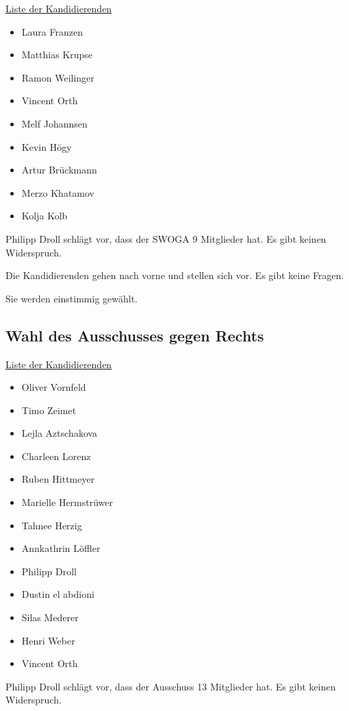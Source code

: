 \documentclass[ngerman,headheight=70pt]{scrartcl}
\begin{document}
    \underline{Liste der Kandidierenden}
    \begin{itemize}
        \item Laura Franzen
        \item Matthias Krupse
        \item Ramon Weilinger
        \item Vincent Orth
        \item Melf Johannsen
        \item Kevin Högy
        \item Artur Brückmann
        \item Merzo Khatamov
        \item Kolja Kolb
    \end{itemize}

    Philipp Droll schlägt vor, dass der SWOGA 9 Mitglieder hat. Es gibt keinen
    Widerspruch.

    Die Kandidierenden gehen nach vorne und stellen sich vor. Es gibt keine
    Fragen.

    Sie werden einstimmig gewählt.

    \subsection{Wahl des Ausschusses gegen Rechts}

    \underline{Liste der Kandidierenden}
    \begin{itemize}
        \item Oliver Vornfeld
        \item Timo Zeimet
        \item Lejla Aztschakova
        \item Charleen Lorenz
        \item Ruben Hittmeyer
        \item Marielle Hermstrüwer
        \item Tahnee Herzig
        \item Annkathrin Löffler
        \item Philipp Droll
        \item Dustin el abdioni
        \item Silas Mederer
        \item Henri Weber
        \item Vincent Orth
    \end{itemize}

    Philipp Droll schlägt vor, dass der Ausschuss 13 Mitglieder hat. Es gibt
    keinen Widerspruch.
\end{document}
